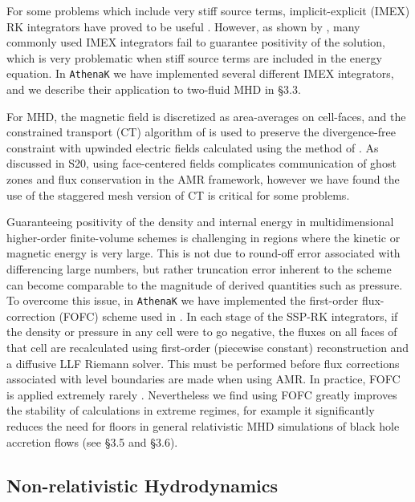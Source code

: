 \documentclass[twocolumn, floatfix]{aastex63}
\newcommand{\ak}{\texttt{AthenaK}}
\begin{document}
For some problems which include very stiff source terms, implicit-explicit (IMEX) RK integrators have proved to be useful \citep{ASCHER1997151}.
However, as shown by \cite{krapp2024ApJS..271....7K}, many commonly used IMEX integrators fail to guarantee positivity of the solution, which is very problematic when stiff source terms are included in the energy equation. In \ak{} we have implemented several different IMEX integrators, and we describe their application to two-fluid MHD in \S3.3.

For MHD, the magnetic field is discretized as area-averages on cell-faces, and the constrained transport (CT) algorithm of \cite{eh1988ApJ...332..659E} is used to preserve the divergence-free constraint with upwinded electric fields calculated using the method of \cite{gs05, gs08}. As discussed in S20, using face-centered fields complicates communication of ghost zones and flux conservation in the AMR framework, however we have found the use of the staggered mesh version of CT is critical for some problems.

Guaranteeing positivity of the density and internal energy in multidimensional higher-order finite-volume schemes is challenging in regions where the kinetic or magnetic energy is very large.  This is not due to round-off error associated with differencing large numbers, but rather truncation error inherent to the scheme can become comparable to the magnitude of derived quantities such as pressure.  To overcome this issue,  in \ak{} we have implemented the first-order flux-correction (FOFC) scheme used in \cite{lemaster2009ApJ...691.1092L}. In each stage of the SSP-RK integrators, if the density or pressure in any cell were to go negative, the fluxes on all faces of that cell are recalculated using first-order (piecewise constant) reconstruction and a diffusive LLF Riemann solver.  This must be performed before flux corrections associated with level boundaries are made when using AMR. In practice, FOFC is applied extremely rarely \citep[once in every $\sim10^{10}$ cell updates in the supersonic turbulence application presented in][]{lemaster2009ApJ...691.1092L}.  Nevertheless we find using FOFC greatly improves the stability of calculations in extreme regimes, for example it significantly reduces the need for floors in general relativistic MHD simulations of black hole accretion flows (see \S3.5 and \S3.6).

\subsection{Non-relativistic Hydrodynamics}
\end{document}
